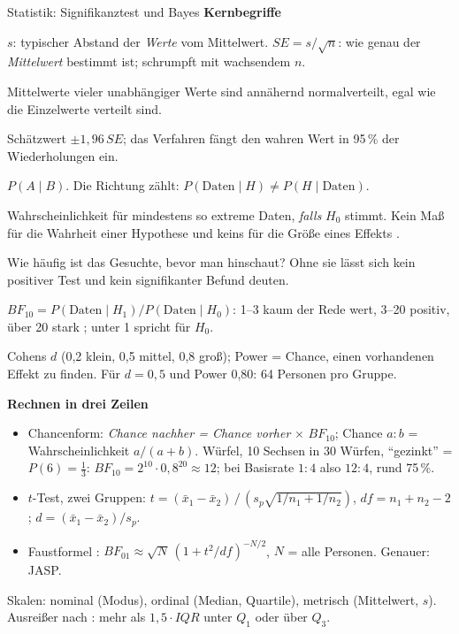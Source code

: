 \begin{handout}{Statistik: Signifikanztest und Bayes}
\textbf{Kernbegriffe}
\begin{description}\itemsep 0pt
  \item[Standardabweichung, Standardfehler] $s$: typischer Abstand der
    \emph{Werte} vom Mittelwert. $\mathit{SE}=s/\sqrt{n}$: wie genau der
    \emph{Mittelwert} bestimmt ist; schrumpft mit wachsendem $n$.
  \item[Zentraler Grenzwertsatz] Mittelwerte vieler unabhängiger Werte
    sind annähernd normalverteilt, egal wie die Einzelwerte verteilt sind.
  \item[Konfidenzintervall] Schätzwert $\pm1{,}96\,\mathit{SE}$; das
    Verfahren fängt den wahren Wert in 95\,\% der Wiederholungen ein.
  \item[Bedingte Wahrscheinlichkeit] $P(A\mid B)$. Die Richtung zählt:
    $P(\text{Daten}\mid H)\neq P(H\mid\text{Daten})$.
  \item[p-Wert] Wahrscheinlichkeit für mindestens so extreme Daten,
    \emph{falls} $H_0$ stimmt. Kein Maß für die Wahrheit einer Hypothese
    und keins für die Größe eines Effekts \parencite{wassersteinlazar2016asa}.
  \item[Basisrate] Wie häufig ist das Gesuchte, bevor man hinschaut? Ohne
    sie lässt sich kein positiver Test und kein signifikanter Befund deuten.
  \item[Bayes-Faktor] $\mathit{BF}_{10}=P(\text{Daten}\mid H_1)/P(\text{Daten}\mid H_0)$:
    1--3 kaum der Rede wert, 3--20 positiv, über 20 stark
    \parencite{kassraftery1995}; unter 1 spricht für $H_0$.
  \item[Effektgröße, Power] Cohens $d$ (0,2 klein, 0,5 mittel, 0,8 groß);
    Power = Chance, einen vorhandenen Effekt zu finden. Für $d=0{,}5$ und
    Power 0,80: 64 Personen pro Gruppe.
\end{description}

\textbf{Rechnen in drei Zeilen}
\begin{itemize}\itemsep 0pt
  \item Chancenform: \emph{Chance nachher = Chance vorher} $\times$
    $\mathit{BF}_{10}$; Chance $a:b$ = Wahrscheinlichkeit $a/(a+b)$.
    Würfel, 10 Sechsen in 30 Würfen, \enquote{gezinkt} = $P(6)=\tfrac13$:
    $\mathit{BF}_{10}=2^{10}\cdot0{,}8^{20}\approx12$; bei Basisrate $1:4$
    also $12:4$, rund 75\,\%.
  \item $t$-Test, zwei Gruppen: $t=(\bar{x}_1-\bar{x}_2)\,/\,(s_p\sqrt{1/n_1+1/n_2})$,
    $\mathit{df}=n_1+n_2-2$; $d=(\bar{x}_1-\bar{x}_2)/s_p$.
  \item Faustformel \parencite{wagenmakers2007practical}:
    $\mathit{BF}_{01}\approx\sqrt{N}\,(1+t^2/\mathit{df})^{-N/2}$, $N$ = alle
    Personen. Genauer: JASP.
\end{itemize}
Skalen: nominal (Modus), ordinal (Median, Quartile), metrisch (Mittelwert,
$s$). Ausreißer nach \textcite{tukey1977eda}: mehr als
$1{,}5\cdot\mathit{IQR}$ unter $Q_1$ oder über $Q_3$.


\end{handout}
